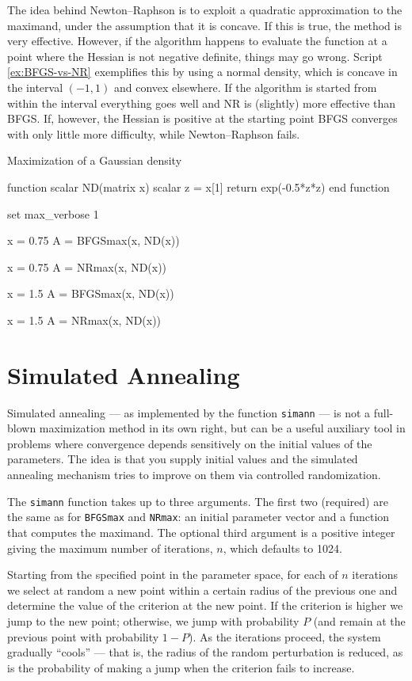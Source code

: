 The idea behind Newton--Raphson is to exploit a quadratic
approximation to the maximand, under the assumption that it is
concave. If this is true, the method is very effective. However, if
the algorithm happens to evaluate the function at a point where the
Hessian is not negative definite, things may go wrong. Script
\ref{ex:BFGS-vs-NR} exemplifies this by using a normal density, which
is concave in the interval $(-1,1)$ and convex elsewhere. If the
algorithm is started from within the interval everything goes well
and NR is (slightly) more effective than BFGS. If, however, the
Hessian is positive at the starting point BFGS converges with only
little more difficulty, while Newton--Raphson fails.

\begin{script}[htbp]
  \caption{Maximization of a Gaussian density}
  \label{ex:BFGS-vs-NR}
\begin{scode}
function scalar ND(matrix x)
    scalar z = x[1]
    return exp(-0.5*z*z)
end function

set max_verbose 1

x = {0.75}
A = BFGSmax(x, ND(x))

x = {0.75}
A = NRmax(x, ND(x))

x = {1.5}
A = BFGSmax(x, ND(x))

x = {1.5}
A = NRmax(x, ND(x))
\end{scode}
\end{script}


\section{Simulated Annealing}
\label{sec:sim-anneal}

Simulated annealing --- as implemented by the  function
\texttt{simann} --- is not a full-blown maximization method in its own
right, but can be a useful auxiliary tool in problems where
convergence depends sensitively on the initial values of the
parameters. The idea is that you supply initial values and the
simulated annealing mechanism tries to improve on them via controlled
randomization.

The \texttt{simann} function takes up to three arguments. The first
two (required) are the same as for \texttt{BFGSmax} and
\texttt{NRmax}: an initial parameter vector and a function that
computes the maximand. The optional third argument is a positive
integer giving the maximum number of iterations, $n$, which defaults
to 1024.

Starting from the specified point in the parameter space, for each of
$n$ iterations we select at random a new point within a certain radius
of the previous one and determine the value of the criterion at the
new point. If the criterion is higher we jump to the new point;
otherwise, we jump with probability $P$ (and remain at the previous
point with probability $1-P$).  As the iterations proceed, the system
gradually ``cools'' --- that is, the radius of the random perturbation
is reduced, as is the probability of making a jump when the criterion
fails to increase.

